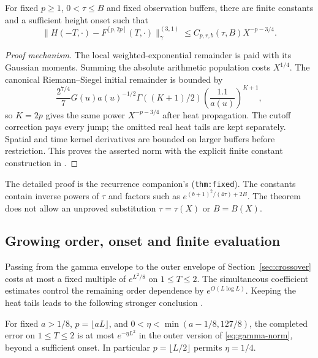 \begin{theorem}
\label{thm:negative-fixed}
For fixed $p\ge1$, $0<\tau\le B$ and fixed observation buffers, there
are finite constants and a sufficient height onset such that
\begin{equation}
 \|H(-T,\cdot)-F^{[p,2p]}(T,\cdot)\|_\gamma^{(3,1)}
          \le C_{p,r,b}(\tau,B)X^{-p-3/4}.
 \label{eq:negative-fixed-error}
\end{equation}
\end{theorem}
\begin{proof}[Proof mechanism]
The local weighted-exponential remainder is paid with its Gaussian
moments. Summing the absolute arithmetic population costs $X^{1/4}$.
The canonical Riemann--Siegel initial remainder is bounded by
\[
 \frac{2^{7/4}}7G(u)a(u)^{-1/2}
       \Gamma((K+1)/2)\left(\frac{1.1}{a(u)}\right)^{K+1},
\]
so $K=2p$ gives the same power $X^{-p-3/4}$ after heat propagation.
The cutoff correction pays every jump; the omitted real heat tails
are kept separately. Spatial and time kernel derivatives are bounded
on larger buffers before restriction. This proves the asserted norm
with the explicit finite constant construction in \cite{recurrence}.
\end{proof}
The detailed proof is the recurrence companion's
(\texttt{thm:fixed}). The constants contain inverse powers of $\tau$ and factors such as
$e^{(b+1)^2/(4\tau)+2B}$. The theorem does not allow an unproved
substitution $\tau=\tau(X)$ or $B=B(X)$.

\subsection{Growing order, onset and finite evaluation}
Passing from the gamma envelope to the outer envelope of
Section~\ref{sec:crossover} costs at most a fixed multiple of
$e^{L^2/8}$ on $1\le T\le2$. The simultaneous coefficient estimates
control the remaining order dependence by $e^{O(L\log L)}$.
Keeping the heat tails leads to the following stronger conclusion
\cite{recurrence,rec-onset,rec-bounds}.

\begin{theorem}
\label{thm:negative-growing}
For fixed $a>1/8$, $p=\lfloor aL\rfloor$, and
$0<\eta<\min(a-1/8,127/8)$, the completed error on $1\le T\le2$
is at most $e^{-\eta L^2}$ in the outer version of
\eqref{eq:gamma-norm}, beyond a sufficient onset. In particular
$p=\lfloor L/2\rfloor$ permits $\eta=1/4$.
\end{theorem}

